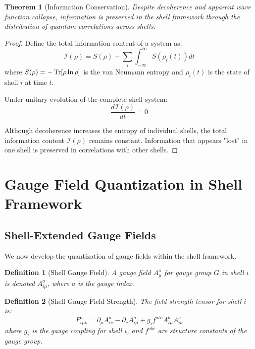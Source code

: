 \documentclass[12pt,a4paper]{article}
\newtheorem{theorem}{Theorem}[section]
\newtheorem{definition}{Definition}[section]
\begin{document}
\begin{theorem}[Information Conservation]
\label{thm:information-conservation}
Despite decoherence and apparent wave function collapse, information is preserved in the shell framework through the distribution of quantum correlations across shells.
\end{theorem}

\begin{proof}
Define the total information content of a system as:
\begin{equation}
\mathcal{I}(\rho) = S(\rho) + \sum_i \int_{-\infty}^{\infty} S(\rho_i(t)) dt
\end{equation}
where $S(\rho) = -\Tr[\rho\ln\rho]$ is the von Neumann entropy and $\rho_i(t)$ is the state of shell $i$ at time $t$.

Under unitary evolution of the complete shell system:
\begin{equation}
\frac{d\mathcal{I}(\rho)}{dt} = 0
\end{equation}

Although decoherence increases the entropy of individual shells, the total information content $\mathcal{I}(\rho)$ remains constant. Information that appears "lost" in one shell is preserved in correlations with other shells.
\end{proof}

\section{Gauge Field Quantization in Shell Framework}
\label{sec:gauge-quantization}

\subsection{Shell-Extended Gauge Fields}
\label{subsec:shell-gauge-fields}

We now develop the quantization of gauge fields within the shell framework.

\begin{definition}[Shell Gauge Field]
\label{def:shell-gauge-field}
A gauge field $A_\mu^a$ for gauge group $G$ in shell $i$ is denoted $A_{i\mu}^a$, where $a$ is the gauge index.
\end{definition}

\begin{definition}[Shell Gauge Field Strength]
\label{def:field-strength}
The field strength tensor for shell $i$ is:
\begin{equation}
F_{i\mu\nu}^a = \partial_\mu A_{i\nu}^a - \partial_\nu A_{i\mu}^a + g_i f^{abc} A_{i\mu}^b A_{i\nu}^c
\end{equation}
where $g_i$ is the gauge coupling for shell $i$, and $f^{abc}$ are structure constants of the gauge group.
\end{definition}
\end{document}
